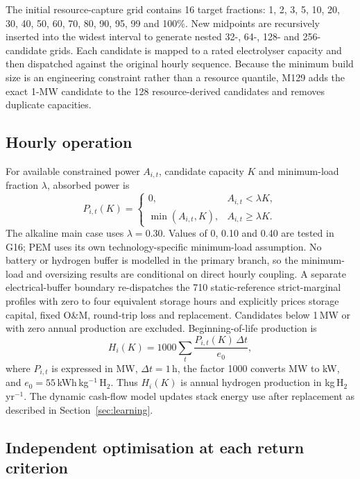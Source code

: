 \documentclass[11pt,a4paper]{article}
\begin{document}
The initial resource-capture grid contains 16 target fractions: 1, 2, 3, 5, 10, 20, 30, 40, 50, 60, 70, 80, 90, 95, 99 and 100\%. New midpoints are recursively inserted into the widest interval to generate nested 32-, 64-, 128- and 256-candidate grids. Each candidate is mapped to a rated electrolyser capacity and then dispatched against the original hourly sequence. Because the minimum build size is an engineering constraint rather than a resource quantile, M129 adds the exact 1-MW candidate to the 128 resource-derived candidates and removes duplicate capacities.

\subsection{Hourly operation}

For available constrained power $A_{i,t}$, candidate capacity $K$ and minimum-load fraction $\lambda$, absorbed power is
\begin{equation}
P_{i,t}(K)=
\begin{cases}
0, & A_{i,t}<\lambda K,\\
\min(A_{i,t},K), & A_{i,t}\geq \lambda K.
\end{cases}
\label{eq:dispatch}
\end{equation}
The alkaline main case uses $\lambda=0.30$. Values of 0, 0.10 and 0.40 are tested in G16; PEM uses its own technology-specific minimum-load assumption. No battery or hydrogen buffer is modelled in the primary branch, so the minimum-load and oversizing results are conditional on direct hourly coupling. A separate electrical-buffer boundary re-dispatches the 710 static-reference strict-marginal profiles with zero to four equivalent storage hours and explicitly prices storage capital, fixed O\&M, round-trip loss and replacement. Candidates below 1\,MW or with zero annual production are excluded. Beginning-of-life production is
\begin{equation}
H_i(K)=1000\sum_t \frac{P_{i,t}(K)\,\Delta t}{e_0},
\label{eq:h2}
\end{equation}
where $P_{i,t}$ is expressed in MW, $\Delta t=1$\,h, the factor 1000 converts MW to kW, and $e_0=55$\,kWh\,kg$^{-1}$\,H$_2$. Thus $H_i(K)$ is annual hydrogen production in kg\,H$_2$\,yr$^{-1}$. The dynamic cash-flow model updates stack energy use after replacement as described in Section~\ref{sec:learning}.

\subsection{Independent optimisation at each return criterion}
\end{document}
